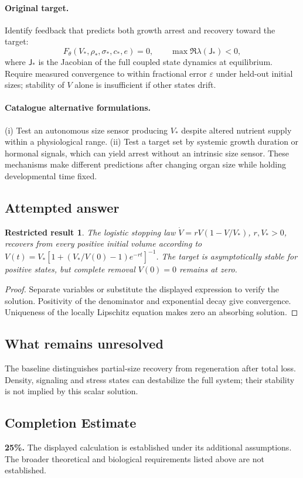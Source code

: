 \documentclass[11pt]{article}
\newtheorem{attemptresult}{Restricted result}[section]
\begin{document}
\paragraph{Original target.}
Identify feedback that predicts both growth arrest and recovery toward the target:
\[
F_\theta(V_*,\rho_*,\sigma_*,c_*,e)=0,
\qquad
\max\Re\lambda(\mathsf J_*)<0,
\]
where $\mathsf J_*$ is the Jacobian of the full coupled state dynamics at equilibrium. Require measured convergence to within fractional error $\varepsilon$ under held-out initial sizes; stability of $V$ alone is insufficient if other states drift.
\paragraph{Catalogue alternative formulations.}
(i) Test an autonomous size sensor producing $V_*$ despite altered nutrient supply within a physiological range. (ii) Test a target set by systemic growth duration or hormonal signals, which can yield arrest without an intrinsic size sensor. These mechanisms make different predictions after changing organ size while holding developmental time fixed.
\subsection{Attempted answer}
\begin{attemptresult}
The logistic stopping law $\dot V=rV(1-V/V_*)$, $r,V_*>0$, recovers from every positive initial volume according to $V(t)=V_*[1+(V_*/V(0)-1)e^{-rt}]^{-1}$. The target is asymptotically stable for positive states, but complete removal $V(0)=0$ remains at zero.
\end{attemptresult}
\begin{proof}
Separate variables or substitute the displayed expression to verify the solution. Positivity of the denominator and exponential decay give convergence. Uniqueness of the locally Lipschitz equation makes zero an absorbing solution.
\end{proof}
\subsection{What remains unresolved}
The baseline distinguishes partial-size recovery from regeneration after total loss. Density, signaling and stress states can destabilize the full system; their stability is not implied by this scalar solution.
\subsection{Completion Estimate}
\textbf{25\%.} The displayed calculation is established under its additional assumptions. The broader theoretical and biological requirements listed above are not established.
\end{document}
